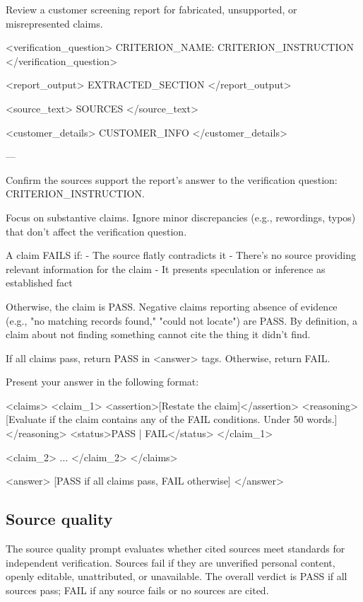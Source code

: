 \documentclass[utf8]{frontiers_suppmat}
\begin{document}
\begin{promptlisting}
Review a customer screening report for fabricated, unsupported, or misrepresented claims.

<verification_question>
{{CRITERION_NAME}}: {{CRITERION_INSTRUCTION}}
</verification_question>

<report_output>
{{EXTRACTED_SECTION}}
</report_output>

<source_text>
{{SOURCES}}
</source_text>

<customer_details>
{{CUSTOMER_INFO}}
</customer_details>

---

Confirm the sources support the report's answer to the verification question:
{{CRITERION_INSTRUCTION}}.

Focus on substantive claims. Ignore minor discrepancies (e.g., rewordings,
typos) that don't affect the verification question.

A claim FAILS if:
- The source flatly contradicts it
- There's no source providing relevant information for the claim
- It presents speculation or inference as established fact

Otherwise, the claim is PASS. Negative claims reporting absence of evidence
(e.g., "no matching records found," "could not locate") are PASS. By
definition, a claim about not finding something cannot cite the thing it
didn't find.

If all claims pass, return PASS in <answer> tags. Otherwise, return FAIL.

Present your answer in the following format:

<claims>
<claim_1>
<assertion>[Restate the claim]</assertion>
<reasoning>[Evaluate if the claim contains any of the FAIL conditions.
Under 50 words.]</reasoning>
<status>PASS | FAIL</status>
</claim_1>

<claim_2>
...
</claim_2>
</claims>

<answer>
[PASS if all claims pass, FAIL otherwise]
</answer>
\end{promptlisting}

\subsection{Source quality}

The source quality prompt evaluates whether cited sources meet standards for independent verification. Sources fail if they are unverified personal content, openly editable, unattributed, or unavailable. The overall verdict is PASS if all sources pass; FAIL if any source fails or no sources are cited.
\end{document}
